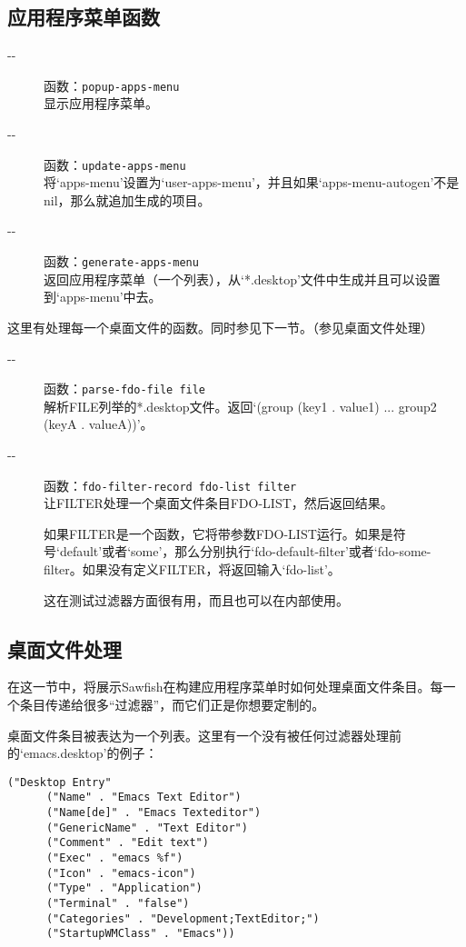 \documentclass{book}
\begin{document}
\begin{CJK*}{UTF8}{gbsn}
\subsection{应用程序菜单函数}
\begin{description}
\item[-{}-] 函数：\verb|popup-apps-menu|\\
显示应用程序菜单。
\item[-{}-] 函数：\verb|update-apps-menu|\\
将`apps-menu'设置为`user-apps-menu'，并且如果`apps-menu-autogen'不是nil，那么就追加生成的项目。
\item[-{}-] 函数：\verb|generate-apps-menu|\\
返回应用程序菜单（一个列表），从`*.desktop'文件中生成并且可以设置到`apps-menu'中去。
\end{description}

这里有处理每一个桌面文件的函数。同时参见下一节。（参见桌面文件处理）
\begin{description}
\item[-{}-] 函数：\verb|parse-fdo-file file|\\
解析FILE列举的*.desktop文件。返回`(group (key1 . value1) ... group2 (keyA . valueA))'。
\item[-{}-] 函数：\verb|fdo-filter-record fdo-list filter|\\
让FILTER处理一个桌面文件条目FDO-LIST，然后返回结果。

如果FILTER是一个函数，它将带参数FDO-LIST运行。如果是符号`default'或者`some'，那么分别执行`fdo-default-filter'或者`fdo-some-filter。如果没有定义FILTER，将返回输入`fdo-list'。

这在测试过滤器方面很有用，而且也可以在内部使用。
\end{description}
\subsection{桌面文件处理}
在这一节中，将展示Sawfish在构建应用程序菜单时如何处理桌面文件条目。每一个条目传递给很多``过滤器''，而它们正是你想要定制的。

桌面文件条目被表达为一个列表。这里有一个没有被任何过滤器处理前的`emacs.desktop'的例子：
\begin{verbatim}
("Desktop Entry"
      ("Name" . "Emacs Text Editor")
      ("Name[de]" . "Emacs Texteditor")
      ("GenericName" . "Text Editor")
      ("Comment" . "Edit text")
      ("Exec" . "emacs %f")
      ("Icon" . "emacs-icon")
      ("Type" . "Application")
      ("Terminal" . "false")
      ("Categories" . "Development;TextEditor;")
      ("StartupWMClass" . "Emacs"))
\end{verbatim}


\end{CJK*}
\end{document}
